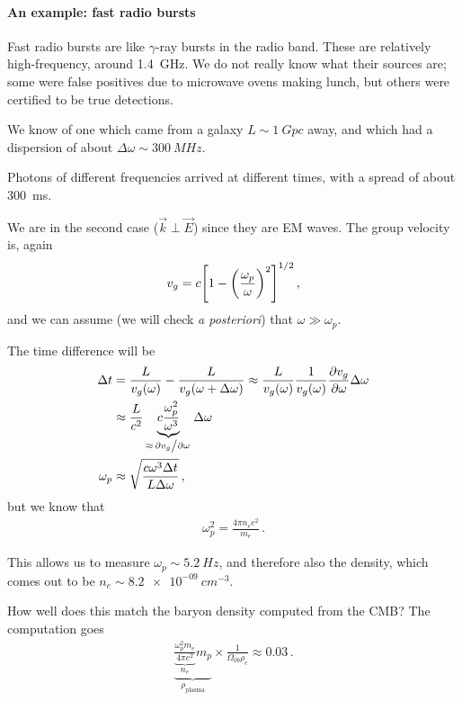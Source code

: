 \documentclass[main.tex]{subfiles}
\begin{document}
\paragraph{An example: fast radio bursts}

Fast radio bursts are like \(\gamma \)-ray bursts in the radio band.
These are relatively high-frequency, around \SI{1.4}{GHz}. 
We do not really know what their sources are; some were false positives due to microwave ovens making lunch, but others were certified to be true detections.

We know of one which came from a galaxy \(L \sim \SI{1}{Gpc}\) away, and which had a dispersion of about \(\Delta \omega \sim \SI{300}{MHz}\). 

Photons of different frequencies arrived at different times, with a spread of about \SI{300}{ms}. 

We are in the second case (\(\vec{k} \perp \vec{E}\)) since they are EM waves. 
The group velocity is, again
%
\begin{align}
v_g = c \qty[ 1 - \qty(\frac{\omega _p}{\omega})^2]^{1/2}
\,,
\end{align}
%
and we can assume (we will check \emph{a posteriori}) that \(\omega \gg \omega _p\). 

The time difference will be 
%
\begin{subequations}
\begin{align}
\Delta t &= \frac{L}{v_g (\omega)} - \frac{L}{v_g (\omega + \Delta \omega )} 
\approx \frac{L}{v_g(\omega )} \frac{1}{v_g(\omega )}\pdv{v_g}{\omega } \Delta \omega  \\
&\approx \frac{L}{c^2} \underbrace{c \frac{\omega _p^2}{\omega^3}}_{\approx \pdv*{v_g}{\omega }} \Delta \omega \\
\omega _p &\approx \sqrt{\frac{ c \omega^3 \Delta t}{L \Delta \omega }}
\,,
\end{align}
\end{subequations}
%
but we know that 
%
\begin{align}
\omega _p^2 = \frac{ 4 \pi n_e e^2}{m_e}
\,.
\end{align}

This allows us to measure \(\omega _p \sim \SI{5.2}{Hz}\), and therefore also the density, which comes out to be \(n_e \sim \SI{8.2e-09}{cm^{-3}}\).

How well does this match the baryon density computed from the CMB? 
The computation goes  
%
\begin{align}
\underbrace{\underbrace{\frac{\omega _p^2 m_e}{4 \pi e^2}}_{n_e} m_p}_{\rho _{\text{plasma}}} \times \frac{1}{\Omega _{0b} \rho _c} \approx 0.03
\,.
\end{align}
\end{document}
